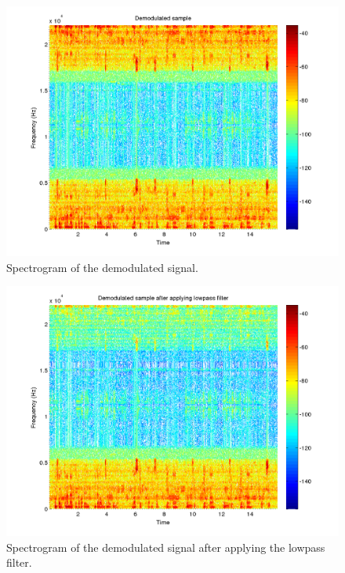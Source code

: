 \begin{figure}
  \begin{center}
    \hspace*{-1in}
    \includegraphics[width=180mm]{q1_demodulated_spectrogram}
    \caption{Spectrogram of the demodulated signal. 
    \label{fig:q1_demodulated_spectrogram}}
  \end{center}  
\end{figure}

\begin{figure}
  \begin{center}
    \hspace*{-1in}
    \includegraphics[width=180mm]{q1_demodulated_filtered_spectrogram}
    \caption{Spectrogram of the demodulated signal after applying the
    lowpass filter. 
      \label{fig:q1_demodulated_filtered_spectrogram}}
  \end{center}  
\end{figure}

